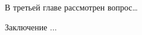\documentclass[times]{itmo-student-thesis}
\begin{document}
В третьей главе рассмотрен вопрос…

Заключение ...





\end{document}
